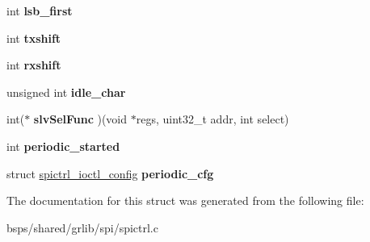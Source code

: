 \begin{DoxyCompactItemize}
int {\bfseries lsb\+\_\+first}
\item 
\mbox{\label{structspictrl__priv_ab97575dc5d66798b1d8f8b48a98177ca}} 
int {\bfseries txshift}
\item 
\mbox{\label{structspictrl__priv_af3087b593340aaf5a6100be07a3b6e5a}} 
int {\bfseries rxshift}
\item 
\mbox{\label{structspictrl__priv_a9dce4a90c0b86a2a31b7e453e9858a2e}} 
unsigned int {\bfseries idle\+\_\+char}
\item 
\mbox{\label{structspictrl__priv_a5488e606163b718d5bdce0585d3dce7c}} 
int($\ast$ {\bfseries slv\+Sel\+Func} )(void $\ast$regs, uint32\+\_\+t addr, int select)
\item 
\mbox{\label{structspictrl__priv_a48e5df0546b796e0aa610204d6f727b2}} 
int {\bfseries periodic\+\_\+started}
\item 
\mbox{\label{structspictrl__priv_ada4d90e079065bafe3e6c7b1ca78e34d}} 
struct \mbox{\hyperlink{structspictrl__ioctl__config}{spictrl\+\_\+ioctl\+\_\+config}} {\bfseries periodic\+\_\+cfg}
\end{DoxyCompactItemize}


The documentation for this struct was generated from the following file\+:\begin{DoxyCompactItemize}
\item 
bsps/shared/grlib/spi/spictrl.\+c\end{DoxyCompactItemize}

